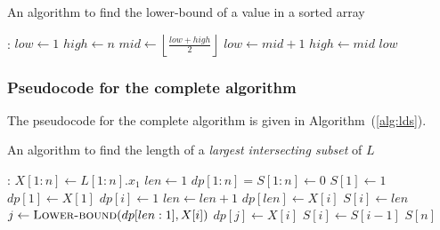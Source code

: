 \documentclass[12pt]{report}
\begin{document}
    \begin{algorithm}
        \caption{An algorithm to find the lower-bound of a value in a sorted array}
        \label{alg:lower-bound}
        \begin{algorithmic}[1]
            :
                \State $low \gets 1$
                \State $high \gets n$
                    \State $mid \gets \left\lfloor \frac{low + high}{2} \right\rfloor$
                        \State $low \gets mid + 1$
                    \Else
                        \State $high \gets mid$
                    \EndIf
                \EndWhile
                \State \Return $low$
            \EndProcedure
        \end{algorithmic}
    \end{algorithm}

    \subsubsection*{Pseudocode for the complete algorithm}
    The pseudocode for the complete algorithm is given in Algorithm~(\ref{alg:lds}).

    \begin{algorithm}
        \caption{An algorithm to find the length of a \textit{largest intersecting subset} of $L$}
        \label{alg:lds}
        \begin{algorithmic}[1]
            :
                \State {}
                \State $X[1:n] \gets L[1:n].x_{1}$
                \State $len \gets 1$
                \State $dp[1:n] = S[1:n] \gets 0$
                \State $S[1] \gets 1$
                \State $dp[1] \gets X[1]$
                    \State $dp[i] \gets 1$
                        \State $len \gets len + 1$
                        \State $dp[len] \gets X[i]$
                        \State $S[i] \gets len$
                    \Else
                        \State $j \gets \Call{Lower-bound}{dp[len:1], X[i]}$
                        \State $dp[j] \gets X[i]$
                        \State $S[i] \gets S[i-1]$
                    \EndIf
                \EndFor
            \State \Return $S[n]$
            \EndProcedure
        \end{algorithmic}
    \end{algorithm}
\end{document}
